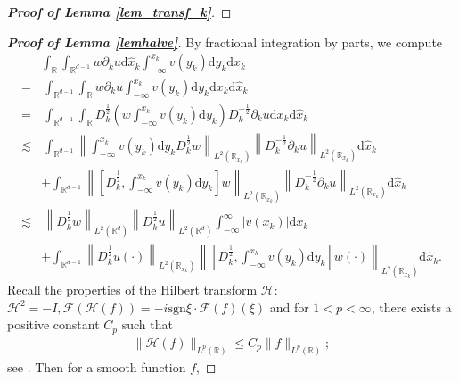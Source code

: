 \documentclass[10pt,twoside,a4paper]{article}
\numberwithin{equation}{section}\allowdisplaybreaks
\def\leq{\leqslant}
\begin{document}
\begin{appendices}
\begin{proof} [\textbf{Proof of Lemma \ref{lem_transf_k}}]
	
	
	
\end{proof}



 
	\begin{proof} [\textbf{Proof of Lemma \ref{lemhalve}}]
	By fractional integration by parts, we compute
		\begin{align} \label{lemhalvec1}
			&\int_{\mathbb{R}}  \int_{\mathbb{R}^{d-1}} w\partial_k u  \mathrm{d} \hat{x}_k \int_{-\infty}^{x_k} v(y_k)\mathrm{d} y_k  \mathrm{d} x_k \nonumber\\
			=&\, \int_{\mathbb{R}^{d-1}}	\int_{\mathbb{R}}   w\partial_k u \int_{-\infty}^{x_k} v(y_k) \mathrm{d} y_k  \mathrm{d} x_k  \mathrm{d} \hat{x}_k\nonumber\\
			=&	\, \int_{\mathbb{R}^{d-1}}\int_{\mathbb{R}}    D_k^{\frac 12} \left( w\int_{-\infty}^{x_k} v(y_k) \mathrm{d} y_k  \right) D_k^{-\frac 12}\partial_k u  \mathrm{d} x_k  \mathrm{d} \hat{x}_k\\
			\lesssim &\,\int_{\mathbb{R}^{d-1}} \left\| \int_{-\infty}^{x_k} v(y_k) \mathrm{d} y_k   D_k^{\frac 12} w\right\|_{L^2(\mathbb{R}_{x_k})} \left\|  D_k^{-\frac 12}\partial_k u \right\|_{L^2(\mathbb{R}_{x_k})}\mathrm{d} \hat{x}_k\nonumber\\
			&+\int_{\mathbb{R}^{d-1}} \left\|\left[D_k^{\frac 12},\int_{-\infty}^{x_k} v(y_k) \mathrm{d} y_k \right]w \right\|_{L^2(\mathbb{R}_{x_k})} \left\|  D_k^{-\frac 12}\partial_k u \right\|_{L^2(\mathbb{R}_{x_k})}\mathrm{d} \hat{x}_k\nonumber\\
			\lesssim &\,\left\|   D_k^{\frac 12}w\right\|_{L^2(\mathbb{R}^d)}\left\|   D_k^{\frac 12}u\right\|_{L^2(\mathbb{R}^d)} \int_{-\infty}^{\infty} |v(x_k) |\mathrm{d} x_k \nonumber\\
			&+\int_{\mathbb{R}^{d-1}} \left\|   D_k^{\frac 12}u(\cdot)\right\|_{L^2(\mathbb{R}_{x_k})} \left\|\left[D_k^{\frac 12},\int_{-\infty}^{x_k} v(y_k) \mathrm{d} y_k \right]w(\cdot) \right\|_{L^2(\mathbb{R}_{x_k})}\mathrm{d} \hat{x}_k.\nonumber
		\end{align}
	Recall the properties of the Hilbert transform $ \mathcal{H} $: $ \mathcal{H}^2=-I, \mathcal{F}\left(\mathcal{H}(f)\right)=- i \mathrm{sgn} \xi \cdot\mathcal{F}(f)(\xi)$ and for $ 1<p<\infty $,  there exists a positive constant $C_p$ such that
		\begin{align}
			\|\mathcal{H}(f)\|_{L^p(\mathbb{R})} \leq C_p\|f\|_{L^p(\mathbb{R})}; \label{Hilt}
		\end{align}
		see  \cite{grafakos2008classical}.  Then for a smooth function $ f $,

\end{proof}
\end{appendices}
\end{document}
